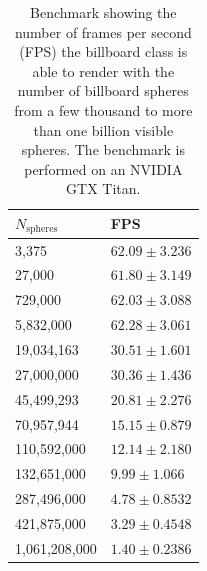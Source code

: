 \begin{table}[htb]
\begin{center}
    \begin{tabular}{|l|l|}
    \hline
    $N_\text{spheres}$ & FPS\\ \hline
    3,375      & $62.09 \pm 3.236$\\
    \hline
    27,000     & $61.80 \pm 3.149$\\
    \hline
    729,000    & $62.03 \pm 3.088$\\
    \hline
    5,832,000   & $62.28 \pm 3.061$\\
    \hline
    19,034,163  & $30.51 \pm 1.601$\\
    \hline
    27,000,000  & $30.36 \pm 1.436$\\
    \hline
    45,499,293  & $20.81 \pm 2.276$\\
    \hline
    70,957,944  & $15.15 \pm 0.879$\\
    \hline
    110,592,000 & $12.14 \pm 2.180$\\
    \hline
    132,651,000 & $9.99 \pm 1.066$\\
    \hline
    287,496,000 & $4.78 \pm 0.8532$\\
    \hline
    421,875,000 & $3.29 \pm 0.4548$\\
    \hline
    1,061,208,000 & $1.40 \pm 0.2386$\\
    \hline
    \end{tabular}
    \caption{Benchmark showing the number of frames per second (FPS) the billboard class is able to render with the number of billboard spheres from a few thousand to more than one billion visible spheres. The benchmark is performed on an NVIDIA GTX Titan.}
    \label{tab:vis_fps_scaling}
    \end{center}
\end{table}

